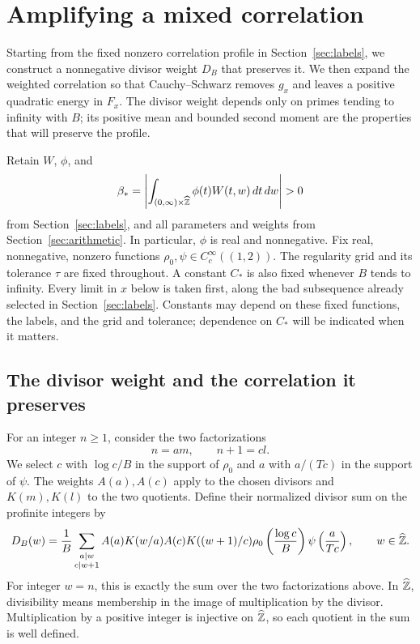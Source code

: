 \section{Amplifying a mixed correlation}\label{sec:amplification}

Starting from the fixed nonzero correlation profile in
Section~\ref{sec:labels}, we construct a nonnegative divisor weight
$D_B$ that preserves it. We then expand the weighted correlation so
that Cauchy--Schwarz removes $g_x$ and leaves a positive quadratic
energy in $F_x$. The divisor weight depends only on primes tending to
infinity with $B$; its positive mean and bounded second moment are the
properties that will preserve the profile.

Retain $W$, $\phi$, and
\[
 \beta_*=
 \left|\int_{(0,\infty)\times\whZ}\phi(t)W(t,w)\,dt\,dw\right|>0
\]
from Section~\ref{sec:labels}, and all parameters and weights from
Section~\ref{sec:arithmetic}. In particular, $\phi$ is real and
nonnegative. Fix real, nonnegative, nonzero functions
$\rho_0,\psi\in C_c^\infty((1,2))$. The regularity grid and its tolerance
$\tau$ are fixed throughout. A constant $C_*$ is also fixed whenever
$B$ tends to infinity. Every limit in $x$ below is taken first, along
the bad subsequence already selected in Section~\ref{sec:labels}.
Constants may depend on these fixed functions, the labels, and the
grid and tolerance; dependence on $C_*$ will be indicated when it
matters.

\subsection{The divisor weight and the correlation it preserves}

For an integer $n\ge1$, consider the two factorizations
\[
 n=am,\qquad n+1=cl.
\]
We select $c$ with $\log c/B$ in the support of $\rho_0$ and $a$ with
$a/(Tc)$ in the support of $\psi$. The weights $A(a),A(c)$ apply to
the chosen divisors and $K(m),K(l)$ to the two quotients. Define their
normalized divisor sum on the profinite integers by
\begin{equation}\label{eq:11}
 D_B(w)=\frac1B
 \sum_{\substack{a\mid w\\ c\mid w+1}}
 A(a)K(w/a)A(c)K((w+1)/c)
 \rho_0\left(\frac{\log c}{B}\right)
 \psi\left(\frac{a}{Tc}\right),
 \qquad w\in\widehat{\mathbb Z}.
\end{equation}
For integer $w=n$, this is exactly the sum over the two factorizations
above. In $\widehat{\mathbb Z}$, divisibility means membership in the image of
multiplication by the divisor. Multiplication by a positive integer is
injective on $\widehat{\mathbb Z}$, so each quotient in the sum is well defined.


